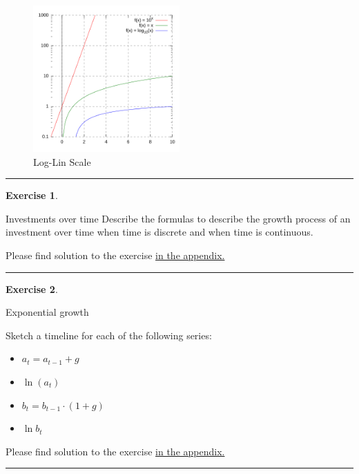 \documentclass[
  12pt,
  oneside]{book}
\providecommand{\tightlist}{%
  \setlength{\itemsep}{0pt}\setlength{\parskip}{0pt}}
\theoremstyle{definition}
\theoremstyle{definition}
\theoremstyle{definition}
\newtheorem{exercise}{Exercise}[chapter]
\theoremstyle{definition}
\theoremstyle{remark}
\begin{document}
\begin{figure}
\centering
\includegraphics[width=0.5\textwidth,height=\textheight]{fig/LogLinScale.png}
\caption{\label{fig:loginscale} Log-Lin Scale}
\end{figure}

\begin{center}\rule{0.5\linewidth}{0.5pt}\end{center}

\begin{exercise}
\protect\hypertarget{exr:invovertime}{}\label{exr:invovertime}

Investments over time
Describe the formulas to describe the growth process of an investment over time when time is discrete and when time is continuous.

Please find solution to the exercise \hyperref[sol:invovertime]{in the appendix.}

\begin{center}\rule{0.5\linewidth}{0.5pt}\end{center}

\end{exercise}

\begin{exercise}
\protect\hypertarget{exr:expovertime}{}\label{exr:expovertime}

Exponential growth

Sketch a timeline for each of the following series:

\begin{itemize}
\tightlist
\item
  \(a_t=a_{t-1}+g\)
\item
  \(\ln(a_t)\)
\item
  \(b_t=b_{t-1}\cdot (1+g)\)
\item
  \(\ln b_t\)
\end{itemize}

Please find solution to the exercise \hyperref[sol:expovertime]{in the appendix.}

\begin{center}\rule{0.5\linewidth}{0.5pt}\end{center}

\end{exercise}
\end{document}
